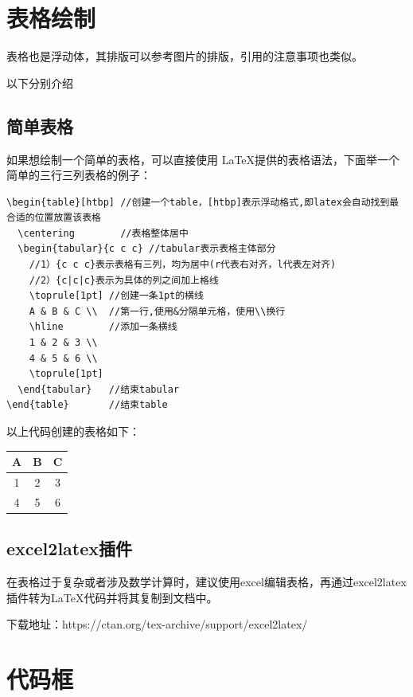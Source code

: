 \documentclass[AutoFakeBold]{ZafuThesis}
\begin{document}
\section{表格绘制}
表格也是浮动体，其排版可以参考图片的排版，引用的注意事项也类似。\par
以下分别介绍
\subsection{简单表格}
如果想绘制一个简单的表格，可以直接使用 \LaTeX 提供的表格语法，下面举一个简单的三行三列表格的例子：
\begin{lstlisting}
\begin{table}[htbp] //创建一个table，[htbp]表示浮动格式,即latex会自动找到最合适的位置放置该表格
  \centering        //表格整体居中
  \begin{tabular}{c c c} //tabular表示表格主体部分
    //1）{c c c}表示表格有三列，均为居中(r代表右对齐，l代表左对齐)
    //2）{c|c|c}表示为具体的列之间加上格线
    \toprule[1pt] //创建一条1pt的横线
    A & B & C \\  //第一行,使用&分隔单元格，使用\\换行
    \hline        //添加一条横线
    1 & 2 & 3 \\
    4 & 5 & 6 \\
    \toprule[1pt]
  \end{tabular}   //结束tabular
\end{table}       //结束table
\end{lstlisting}
\par 以上代码创建的表格如下：
\begin{table}[htbp] 
  \centering 
  \begin{tabular}{c c c}
    \toprule[1pt]
    A & B & C \\  
    \hline       
    1 & 2 & 3 \\
    4 & 5 & 6 \\
    \toprule[1pt]
  \end{tabular} 
\end{table} 
\subsection{excel2latex插件}
在表格过于复杂或者涉及数学计算时，建议使用excel编辑表格，再通过excel2latex插件转为\LaTeX 代码并将其复制到文档中。
\par
下载地址：https://ctan.org/tex-archive/support/excel2latex/

\section{代码框}
\end{document}
